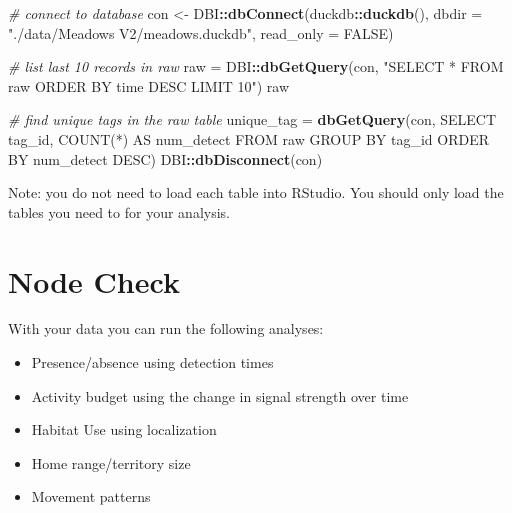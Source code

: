 \documentclass[
]{book}
\newenvironment{Shaded}{\begin{snugshade}}{\end{snugshade}}
\newcommand{\AttributeTok}[1]{\textcolor[rgb]{0.13,0.29,0.53}{#1}}
\newcommand{\CommentTok}[1]{\textcolor[rgb]{0.56,0.35,0.01}{\textit{#1}}}
\newcommand{\ConstantTok}[1]{\textcolor[rgb]{0.56,0.35,0.01}{#1}}
\newcommand{\FunctionTok}[1]{\textcolor[rgb]{0.13,0.29,0.53}{\textbf{#1}}}
\newcommand{\NormalTok}[1]{#1}
\newcommand{\OtherTok}[1]{\textcolor[rgb]{0.56,0.35,0.01}{#1}}
\newcommand{\SpecialCharTok}[1]{\textcolor[rgb]{0.81,0.36,0.00}{\textbf{#1}}}
\newcommand{\StringTok}[1]{\textcolor[rgb]{0.31,0.60,0.02}{#1}}
\providecommand{\tightlist}{%
  \setlength{\itemsep}{0pt}\setlength{\parskip}{0pt}}
\begin{document}
\begin{Shaded}
\begin{Highlighting}[]
\CommentTok{\# connect to database}
\NormalTok{con }\OtherTok{\textless{}{-}}\NormalTok{ DBI}\SpecialCharTok{::}\FunctionTok{dbConnect}\NormalTok{(duckdb}\SpecialCharTok{::}\FunctionTok{duckdb}\NormalTok{(), }
                      \AttributeTok{dbdir =} \StringTok{"./data/Meadows V2/meadows.duckdb"}\NormalTok{, }
                      \AttributeTok{read\_only =} \ConstantTok{FALSE}\NormalTok{)}

\CommentTok{\# list last 10 records in raw}
\NormalTok{raw }\OtherTok{=}\NormalTok{ DBI}\SpecialCharTok{::}\FunctionTok{dbGetQuery}\NormalTok{(con, }\StringTok{"SELECT * FROM raw}
\StringTok{                           ORDER BY time DESC}
\StringTok{                           LIMIT 10"}\NormalTok{)}
\NormalTok{raw}

\CommentTok{\# find unique tags in the raw table}
\NormalTok{unique\_tag }\OtherTok{=} \FunctionTok{dbGetQuery}\NormalTok{(con,}
                        \StringTok{\textquotesingle{}SELECT tag\_id, COUNT(*) AS num\_detect}
\StringTok{                        FROM raw}
\StringTok{                        GROUP BY tag\_id}
\StringTok{                        ORDER BY num\_detect DESC\textquotesingle{}}\NormalTok{)}
\NormalTok{DBI}\SpecialCharTok{::}\FunctionTok{dbDisconnect}\NormalTok{(con)}
\end{Highlighting}
\end{Shaded}

Note: you do not need to load each table into RStudio. You should only load the tables you need to for your analysis.

\chapter{Node Check}\label{node-check}

With your data you can run the following analyses:

\begin{itemize}
\tightlist
\item
  Presence/absence using detection times
\item
  Activity budget using the change in signal strength over time
\item
  Habitat Use using localization
\item
  Home range/territory size
\item
  Movement patterns
\end{itemize}
\end{document}
